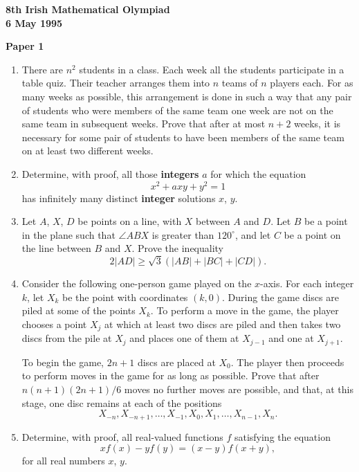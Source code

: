 \documentclass[12pt]{article}
\begin{document}
\begin{center}
{\large\bfseries 8th Irish Mathematical Olympiad\\6 May 1995}
\end{center}
\bigskip\noindent\textbf{Paper 1}\bigskip
\begin{enumerate}
\item There are $n^2$ students in a class. Each week all the students participate in a table quiz. Their teacher arranges them into $n$ teams of $n$ players each. For as many weeks as possible, this arrangement is done in such a way that any pair of students who were members of the same team one week are not on the same team in subsequent weeks. Prove that after at most $n + 2$ weeks, it is necessary for some pair of students to have been members of the same team on at least two different weeks.

\item Determine, with proof, all those \textbf{integers} $a$ for which the equation
\[x^2 + axy + y^2 = 1\]
has infinitely many distinct \textbf{integer} solutions $x$, $y$.

\item Let $A$, $X$, $D$ be points on a line, with $X$ between $A$ and $D$. Let $B$ be a point in the plane such that $\angle ABX$ is greater than $120^\circ$, and let $C$ be a point on the line between $B$ and $X$. Prove the inequality
\[2|AD| \ge \sqrt{3}(|AB| + |BC| + |CD|).\]

\item Consider the following one-person game played on the $x$-axis. For each integer $k$, let $X_k$ be the point with coordinates $(k, 0)$. During the game discs are piled at some of the points $X_k$. To perform a move in the game, the player chooses a point $X_j$ at which at least two discs are piled and then takes two discs from the pile at $X_j$ and places one of them at $X_{j-1}$ and one at $X_{j+1}$.

To begin the game, $2n + 1$ discs are placed at $X_0$. The player then proceeds to perform moves in the game for as long as possible. Prove that after $n(n+1)(2n+1)/6$ moves no further moves are possible, and that, at this stage, one disc remains at each of the positions
\[X_{-n}, X_{-n+1}, \ldots, X_{-1}, X_0, X_1, \ldots, X_{n-1}, X_n.\]

\item Determine, with proof, all real-valued functions $f$ satisfying the equation
\[xf(x) - yf(y) = (x-y)f(x+y),\]
for all real numbers $x$, $y$.
\end{enumerate}
\end{document}

